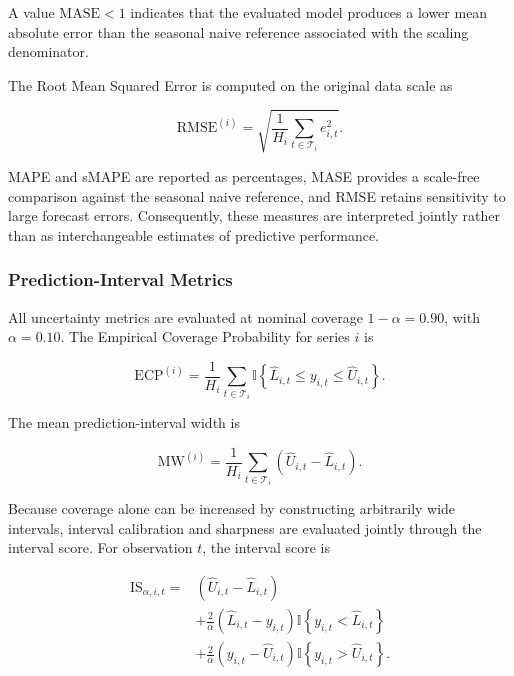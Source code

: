 \documentclass[review,number,sort&compress]{elsarticle}
\begin{document}
A value $\mathrm{MASE}<1$ indicates that the evaluated model produces a lower mean absolute error than the seasonal naive reference associated with the scaling denominator.

The Root Mean Squared Error is computed on the original data scale as

\begin{equation}
\mathrm{RMSE}^{(i)}
=
\sqrt{
    \frac{1}{H_i}
    \sum_{t\in\mathcal{T}_i}
    e_{i,t}^{2}
}.
\label{eq:rmse}
\end{equation}

MAPE and sMAPE are reported as percentages, MASE provides a scale-free comparison against the seasonal naive reference, and RMSE retains sensitivity to large forecast errors. Consequently, these measures are interpreted jointly rather than as interchangeable estimates of predictive performance.

\subsubsection{Prediction-Interval Metrics}

All uncertainty metrics are evaluated at nominal coverage $1-\alpha=0.90$, with $\alpha=0.10$. The Empirical Coverage Probability for series $i$ is

\begin{equation}
\mathrm{ECP}^{(i)}
=
\frac{1}{H_i}
\sum_{t\in\mathcal{T}_i}
\mathbb{I}
\left\{
    \widehat{L}_{i,t}
    \leq
    y_{i,t}
    \leq
    \widehat{U}_{i,t}
\right\}.
\label{eq:ecp}
\end{equation}

The mean prediction-interval width is

\begin{equation}
\mathrm{MW}^{(i)}
=
\frac{1}{H_i}
\sum_{t\in\mathcal{T}_i}
\left(
    \widehat{U}_{i,t}
    -
    \widehat{L}_{i,t}
\right).
\label{eq:mean_width}
\end{equation}

Because coverage alone can be increased by constructing arbitrarily wide intervals, interval calibration and sharpness are evaluated jointly through the interval score. For observation $t$, the interval score is

\begin{align}
\mathrm{IS}_{\alpha,i,t}
={}&
\left(
    \widehat{U}_{i,t}
    -
    \widehat{L}_{i,t}
\right)
\nonumber\\
&+
\frac{2}{\alpha}
\left(
    \widehat{L}_{i,t}-y_{i,t}
\right)
\mathbb{I}
\left\{
    y_{i,t}<\widehat{L}_{i,t}
\right\}
\nonumber\\
&+
\frac{2}{\alpha}
\left(
    y_{i,t}-\widehat{U}_{i,t}
\right)
\mathbb{I}
\left\{
    y_{i,t}>\widehat{U}_{i,t}
\right\}.
\label{eq:interval_score}
\end{align}
\end{document}
